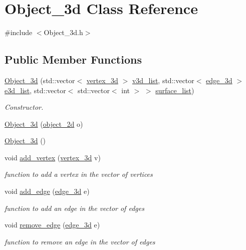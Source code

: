 \hypertarget{class_object__3d}{}\section{Object\+\_\+3d Class Reference}
\label{class_object__3d}


{\ttfamily \#include $<$Object\+\_\+3d.\+h$>$}

\subsection*{Public Member Functions}
\begin{DoxyCompactItemize}
\item 
\hyperlink{class_object__3d_ad2e34d10075c342d690bd8d6648af371}{Object\+\_\+3d} (std\+::vector$<$ \hyperlink{classvertex__3d}{vertex\+\_\+3d} $>$ \hyperlink{class_object__3d_a7817c087a9d1bb4f0e077e2b070e9596}{v3d\+\_\+list}, std\+::vector$<$ \hyperlink{classedge__3d}{edge\+\_\+3d} $>$ \hyperlink{class_object__3d_a678f396b3aa4a3c0958ec0c7b7f36e89}{e3d\+\_\+list}, std\+::vector$<$ std\+::vector$<$ int $>$ $>$ \hyperlink{class_object__3d_a979ba92cf69caa653b89cf75fd278afe}{surface\+\_\+list})
\begin{DoxyCompactList}\small\item\em Constructor. \end{DoxyCompactList}\item 
\hyperlink{class_object__3d_abe30ddbc60c6bff11d4603ddfbd0e7c8}{Object\+\_\+3d} (\hyperlink{classobject__2d}{object\+\_\+2d} o)
\item 
\hyperlink{class_object__3d_aab341c1f81c8c3d18e7246c7bdc3ad27}{Object\+\_\+3d} ()
\item 
void \hyperlink{class_object__3d_a52e3ed72c9afd7e0cbe1191f0ae7be03}{add\+\_\+vertex} (\hyperlink{classvertex__3d}{vertex\+\_\+3d} v)
\begin{DoxyCompactList}\small\item\em function to add a vertex in the vector of vertices \end{DoxyCompactList}\item 
void \hyperlink{class_object__3d_a19b46c5f95adb7b81cf8ee514b6bef60}{add\+\_\+edge} (\hyperlink{classedge__3d}{edge\+\_\+3d} e)
\begin{DoxyCompactList}\small\item\em function to add an edge in the vector of edges \end{DoxyCompactList}\item 
void \hyperlink{class_object__3d_a546b0512f0df977d381ab4964ab12a9b}{remove\+\_\+edge} (\hyperlink{classedge__3d}{edge\+\_\+3d} e)
\begin{DoxyCompactList}\small\item\em function to remove an edge in the vector of edges \end{DoxyCompactList}\end{DoxyCompactItemize}
